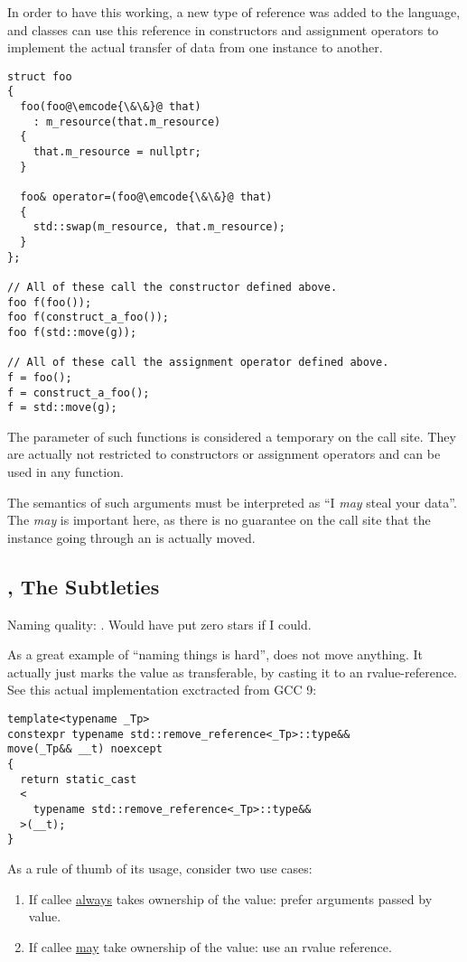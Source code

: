 In order to have this working, a new type of reference was added to
the language, and classes can use this reference in constructors and
assignment operators to implement the actual transfer of data from one
instance to another.

\begin{lstlisting}
struct foo
{
  foo(foo@\emcode{\&\&}@ that)
    : m_resource(that.m_resource)
  {
    that.m_resource = nullptr;
  }

  foo& operator=(foo@\emcode{\&\&}@ that)
  {
    std::swap(m_resource, that.m_resource);
  }
};

// All of these call the constructor defined above.
foo f(foo());
foo f(construct_a_foo());
foo f(std::move(g));

// All of these call the assignment operator defined above.
f = foo();
f = construct_a_foo();
f = std::move(g);
\end{lstlisting}

The parameter of such functions is considered a temporary on the call
site. They are actually not restricted to constructors or assignment
operators and can be used in any function.

The semantics of such arguments must be interpreted as ``I {\em may}
steal your data''. The {\em may} is important here, as there is no
guarantee on the call site that the instance going through an
 is actually moved.

\subsection{, The Subtleties}

Naming quality: \faStar\faStarO\faStarO\faStarO\faStarO. Would have
put zero stars if I could.

As a great example of ``naming things is hard'',  does
not move anything. It actually just marks the value as transferable,
by casting it to an rvalue-reference. See this actual implementation
exctracted from GCC 9:

\begin{lstlisting}
template<typename _Tp>
constexpr typename std::remove_reference<_Tp>::type&&
move(_Tp&& __t) noexcept
{
  return static_cast
  <
    typename std::remove_reference<_Tp>::type&&
  >(__t);
}
\end{lstlisting}

\begin{guideline}
  As a rule of thumb of its usage, consider two use cases:

  \begin{enumerate}
  \item If callee \underline{always} takes ownership of the value:
    prefer arguments passed by value.
  \item If callee \underline{may} take ownership of the value: use an
    rvalue reference.
  \end{enumerate}
\end{guideline}

